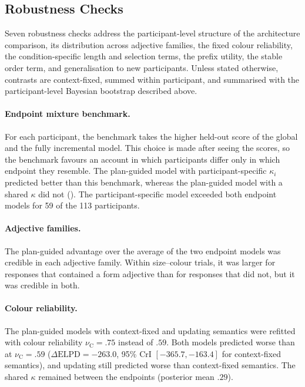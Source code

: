 \documentclass[10pt,a4paper,fleqn]{article}
\begin{document}
\subsection{Robustness Checks}
\label{sec:appendix:robustness}

Seven robustness checks address the participant-level structure of the architecture comparison, its distribution across adjective families, the fixed colour reliability, the condition-specific length and selection terms, the prefix utility, the stable order term, and generalisation to new participants.
Unless stated otherwise, contrasts are context-fixed, summed within participant, and summarised with the participant-level Bayesian bootstrap described above.

\paragraph{Endpoint mixture benchmark.}
For each participant, the benchmark takes the higher held-out score of the global and the fully incremental model.
This choice is made after seeing the scores, so the benchmark favours an account in which participants differ only in which endpoint they resemble.
The plan-guided model with participant-specific $\kappa_i$ predicted better than this benchmark, whereas the plan-guided model with a shared $\kappa$ did not ().
The participant-specific model exceeded both endpoint models for 59 of the 113 participants.

\paragraph{Adjective families.}
The plan-guided advantage over the average of the two endpoint models was credible in each adjective family.
Within size--colour trials, it was larger for responses that contained a form adjective than for responses that did not, but it was credible in both.

\paragraph{Colour reliability.}
The plan-guided models with context-fixed and updating semantics were refitted with colour reliability $\nu_{\mathrm C}=.75$ instead of $.59$.
Both models predicted worse than at $\nu_{\mathrm C}=.59$ ($\Delta\mathrm{ELPD}=-263.0$, 95\% CrI $[-365.7,-163.4]$ for context-fixed semantics), and updating still predicted worse than context-fixed semantics.
The shared $\kappa$ remained between the endpoints (posterior mean $.29$).
\end{document}
